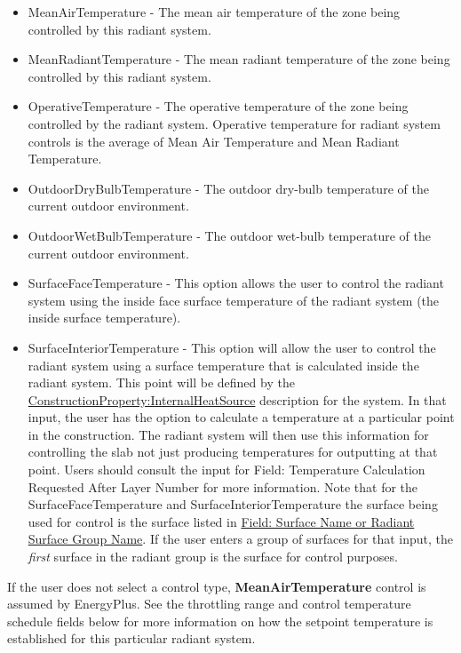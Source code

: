\begin{itemize}
	\item
	MeanAirTemperature - The mean air temperature of the zone being controlled by this radiant system.
	\item
	MeanRadiantTemperature - The mean radiant temperature of the zone being controlled by this radiant system.
	\item
	OperativeTemperature - The operative temperature of the zone being controlled by the radiant system. Operative temperature for radiant system controls is the average of Mean Air Temperature and Mean Radiant Temperature.
	\item
	OutdoorDryBulbTemperature - The outdoor dry-bulb temperature of the current outdoor environment.
	\item
	OutdoorWetBulbTemperature - The outdoor wet-bulb temperature of the current outdoor environment.
	\item
	SurfaceFaceTemperature - This option allows the user to control the radiant system using the inside face surface temperature of the radiant system (the inside surface temperature).
	\item SurfaceInteriorTemperature - This option will allow the user to control
	the radiant system using a surface temperature that is calculated inside
	the radiant system.  This point will be defined by the
	\hyperref[constructioninternalsource]{ConstructionProperty:InternalHeatSource}
	description for the system.  In that input, the user has the option to
	calculate a temperature at a particular point in the construction.  The
	radiant system will then use this information for controlling the slab
	not just producing temperatures for outputting at that point.  Users
	should consult the input for Field: Temperature Calculation Requested
	After Layer Number for more information.  Note that for the
	SurfaceFaceTemperature and SurfaceInteriorTemperature the surface being
	used for control is the surface listed in \hyperref[field-surface-name-or-radiant-surface-group-name]{Field: Surface Name or Radiant Surface Group Name}.  If the user enters a group of surfaces for that input, the
	\emph{first} surface in the radiant group is the surface for control
	purposes.
\end{itemize}

If the user does not select a control type, \textbf{MeanAirTemperature} control is assumed by EnergyPlus. See the throttling range and control temperature schedule fields below for more information on how the setpoint temperature is established for this particular radiant system.

